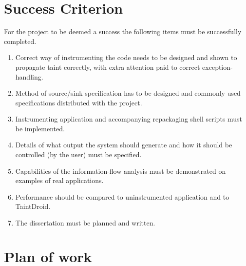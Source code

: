 \documentclass[12pt]{article}
\begin{document}
\section*{Success Criterion}

For the project to be deemed a success the following items must be
successfully completed.

\begin{enumerate}

\item Correct way of instrumenting the code needs to be designed and shown
       to propagate taint correctly, with extra attention paid to correct
       exception-handling.

\item Method of source/sink specification has to be designed and commonly
       used specifications distributed with the project.

\item Instrumenting application and accompanying repackaging shell scripts
       must be implemented.

\item Details of what output the system should generate and how it
       should be controlled (by the user) must be specified.

\item Capabilities of the information-flow analysis must be demonstrated
       on examples of real applications.

\item Performance should be compared to uninstrumented application and to
       TaintDroid.

\item The dissertation must be planned and written.

\end{enumerate}

\section*{Plan of work}
\end{document}
